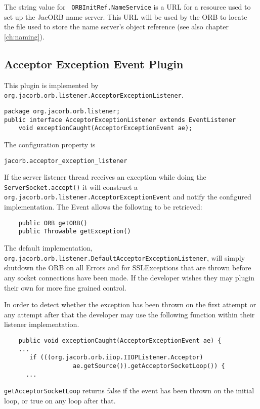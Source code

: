 The  string value  for  {\tt
ORBInitRef.NameService} is  a URL  for a resource  used to set  up the
JacORB name  server. This URL  will be used  by the ORB to  locate the
file  used to  store  the  name server's  object  reference (see  also
chapter \ref{ch:naming}).

\subsection{Acceptor Exception Event Plugin}
\label{acceptorevent}
This plugin is implemented by {\tt
org.jacorb.orb.listener.AcceptorExceptionListener}.
\begin{small}
\begin{verbatim}
package org.jacorb.orb.listener;
public interface AcceptorExceptionListener extends EventListener
    void exceptionCaught(AcceptorExceptionEvent ae);
\end{verbatim}
\end{small}
The configuration property is
\begin{verbatim}
jacorb.acceptor_exception_listener
\end{verbatim}
If the server listener thread receives an exception while doing the {\tt
ServerSocket.accept()} it will construct a {\tt
org.jacorb.orb.listener.AcceptorExceptionEvent} and notify the configured
implementation. The Event allows the following to be retrieved:
\begin{small}
\begin{verbatim}
    public ORB getORB()
    public Throwable getException()
\end{verbatim}
\end{small}
The default implementation, {\tt
org.jacorb.orb.listener.DefaultAcceptor\-ExceptionListener}, will simply shutdown
the ORB on all Errors and for SSLExceptions that are thrown before any socket
connections have been made. If the developer wishes they may plugin
their own for more fine grained control.

In order to detect whether the exception has been thrown on the first attempt
or any attempt after that the developer may use the following function within
their listener implementation.
\begin{small}
\begin{verbatim}
    public void exceptionCaught(AcceptorExceptionEvent ae) {
    ...
       if (((org.jacorb.orb.iiop.IIOPListener.Acceptor)
                   ae.getSource()).getAcceptorSocketLoop()) {
      ...
\end{verbatim}
\end{small}
{\tt getAcceptorSocketLoop} returns false if the event has been thrown on the
initial loop, or true on any loop after that.

